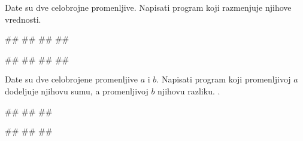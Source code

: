\begin{Exercise}[label=v1.1_10] 
Date su dve celobrojne promenljive. Napisati program koji razmenjuje njihove vrednosti.

\begin{miditest}
\begin{upotreba}{1}
#\naslovInt#
##
##
##
\end{upotreba}
\end{miditest}
\begin{miditest}
\begin{upotreba}{2}
#\naslovInt#
##
##
##
\end{upotreba}
\end{miditest}

\end{Exercise}
\begin{Answer}[ref=v1.1_10]
\end{Answer}

\begin{Exercise}[label=p1_14]
Date su dve celobrojene promenljive $a$ i $b$. Napisati program koji promenljivoj $a$ dodeljuje
njihovu sumu, a promenljivoj $b$ njihovu razliku. . 

\begin{miditest}
\begin{upotreba}{1}
#\naslovInt#
##
##
\end{upotreba}
\end{miditest}
\begin{miditest}
\begin{upotreba}{2}
#\naslovInt#
##
##
\end{upotreba}
\end{miditest}

\end{Exercise}



